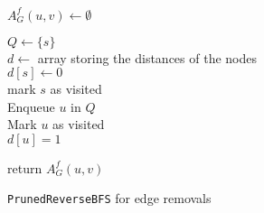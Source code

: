 \begin{algorithm2e}[h!]
 \label{alg:prunedReverseBFSRemovals}
   $A_G^f(u, v) \gets \emptyset$
   
   $Q \gets \{s\}$ \\
   $d \gets $ array storing the distances of the nodes \\
   $d[s] \gets 0$ \\
   mark $s$ as visited \\
   
   Enqueue $u$ in $Q$ \label{alg:addingAdditionalNeighbor} \\
   Mark $u$ as visited \\
   $d[u] = 1$ \label{alg:addingAdditionalNeighborEnd} \\
   
   
   return $A_G^f(u, v)$ 
   
 \caption{\texttt{PrunedReverseBFS} for edge removals}
\end{algorithm2e}

